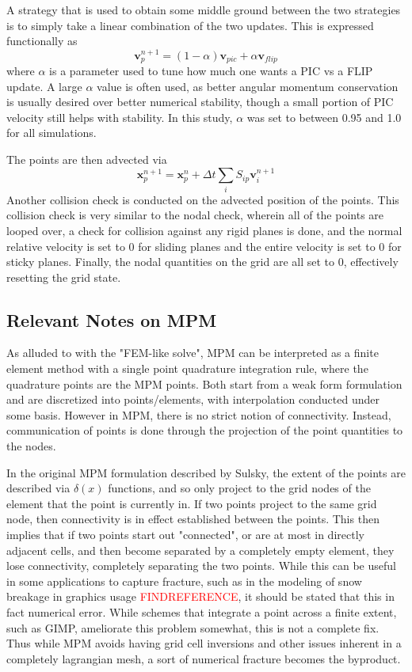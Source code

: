 A strategy that is used to obtain some middle ground between the two strategies is to simply take a linear combination of the two updates. This is expressed functionally as
\begin{equation}
\bm{v}^{n+1}_p=(1-\alpha)\bm{v}_{pic} + \alpha \bm{v}_{flip}
\end{equation}
where $\alpha$ is a parameter used to tune how much one wants a PIC vs a FLIP update. A large $\alpha$ value is often used, as better angular momentum conservation is usually desired over better numerical stability, though a small portion of PIC velocity still helps with stability. In this study, $\alpha$ was set to between 0.95 and 1.0 for all simulations. 

The points are then advected via
\begin{equation}
\bm{x}^{n+1}_p=\bm{x}^n_p+\Delta t\sum_{i}S_{ip}\bm{v}^{n+1}_i
\end{equation}
Another collision check is conducted on the advected position of the points. This collision check is very similar to the nodal check, wherein all of the points are looped over, a check for collision against any rigid planes is done, and the normal relative velocity is set to 0 for sliding planes and the entire velocity is set to 0 for sticky planes. Finally, the nodal quantities on the grid are all set to 0, effectively resetting the grid state.

\subsection{Relevant Notes on MPM}
As alluded to with the "FEM-like solve", MPM can be interpreted as a finite element method with a single point quadrature integration rule, where the quadrature points are the MPM points. Both start from a weak form formulation and are discretized into points/elements, with interpolation conducted under some basis. However in MPM, there is no strict notion of connectivity. Instead, communication of points is done through the projection of the point quantities to the nodes.

In the original MPM formulation described by Sulsky, the extent of the points are described via $\delta(x)$ functions, and so only project to the grid nodes of the element that the point is currently in. If two points project to the same grid node, then connectivity is in effect established between the points. This then implies that if two points start out "connected", or are at most in directly adjacent cells, and then become separated by a completely empty element, they lose connectivity, completely separating the two points. While this can be useful in some applications to capture fracture, such as in the modeling of snow breakage in graphics usage \textcolor{red}{FINDREFERENCE}, it should be stated that this in fact numerical error. While schemes that integrate a point across a finite extent, such as GIMP, ameliorate this problem somewhat, this is not a complete fix. Thus while MPM avoids having grid cell inversions and other issues inherent in a completely lagrangian mesh, a sort of numerical fracture becomes the byproduct.

